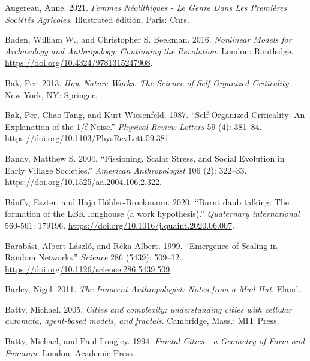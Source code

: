\documentclass[
  12pt,
  a4paper, twoside]{book}
\newlength{\cslhangindent}
\newlength{\cslentryspacingunit} %
\newenvironment{CSLReferences}[2] %
 {%
  \setlength{\parindent}{0pt}
  \ifodd #1
  \let\oldpar\par
  \def\par{\hangindent=\cslhangindent\oldpar}
  \fi
  \setlength{\parskip}{#2\cslentryspacingunit}
 }%
 {}
\begin{document}
\begin{CSLReferences}{1}{0}
\leavevmode{}%
Augereau, Anne. 2021. \emph{Femmes Néolithiques - Le Genre Dans Les Premières Sociétés Agricoles}. Illustrated édition. Paris: Cnrs.

\leavevmode{}%
Baden, William W., and Christopher S. Beekman. 2016. \emph{Nonlinear Models for Archaeology and Anthropology: Continuing the Revolution}. London: Routledge. \url{https://doi.org/10.4324/9781315247908}.

\leavevmode{}%
Bak, Per. 2013. \emph{How {Nature Works}: {The Science} of {Self-Organized Criticality}}. {New York, NY}: {Springer}.

\leavevmode{}%
Bak, Per, Chao Tang, and Kurt Wiesenfeld. 1987. {``Self-Organized Criticality: {An} Explanation of the 1/f Noise.''} \emph{Physical Review Letters} 59 (4): 381--84. \url{https://doi.org/10.1103/PhysRevLett.59.381}.

\leavevmode{}%
Bandy, Matthew S. 2004. {``Fissioning, Scalar Stress, and Social Evolution in Early Village Societies.''} \emph{American Anthropologist} 106 (2): 322--33. \url{https://doi.org/10.1525/aa.2004.106.2.322}.

\leavevmode{}%
Bánffy, Eszter, and Hajo Höhler-Brockmann. 2020. {``Burnt daub talking: The formation of the LBK longhouse (a work hypothesis).''} \emph{Quaternary international} 560-561: 179196. \url{https://doi.org/10.1016/j.quaint.2020.06.007}.

\leavevmode{}%
Barabási, Albert-László, and Réka Albert. 1999. {``Emergence of Scaling in Random Networks.''} \emph{Science} 286 (5439): 509--12. \url{https://doi.org/10.1126/science.286.5439.509}.

\leavevmode{}%
Barley, Nigel. 2011. \emph{The Innocent Anthropologist: Notes from a Mud Hut}. Eland.

\leavevmode{}%
Batty, Michael. 2005. \emph{Cities and complexity: understanding cities with cellular automata, agent-based models, and fractals}. Cambridge, Mass.: MIT Press.

\leavevmode{}%
Batty, Michael, and Paul Longley. 1994. \emph{Fractal Cities - a Geometry of Form and Function}. London: Academic Press.


\end{CSLReferences}
\end{document}
